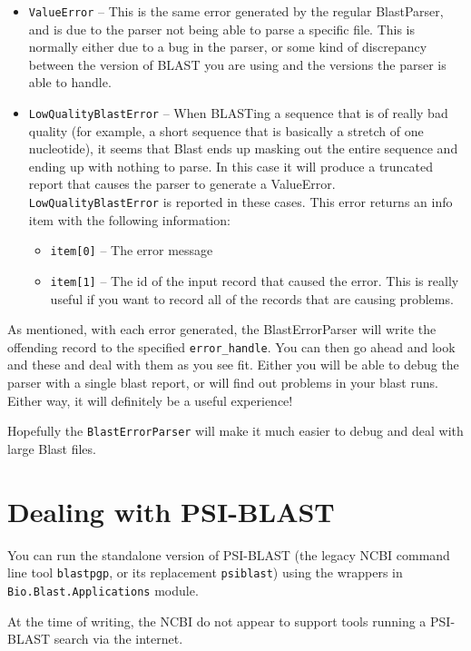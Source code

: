 \documentclass{report}
\begin{document}
\begin{itemize}
  \item \verb|ValueError| -- This is the same error generated by the regular BlastParser, and is due to the parser not being able to parse a specific file. This is normally either due to a bug in the parser, or some kind of discrepancy between the version of BLAST you are using and the versions the parser is able to handle.

  \item \verb|LowQualityBlastError| -- When BLASTing a sequence that is of really bad quality (for example, a short sequence that is basically a stretch of one nucleotide), it seems that Blast ends up masking out the entire sequence and ending up with nothing to parse. In this case it will produce a truncated report that causes the parser to generate a ValueError. \verb|LowQualityBlastError| is reported in these cases. This error returns an info item with the following information:
  \begin{itemize}
    \item \verb|item[0]| -- The error message
    \item \verb|item[1]| -- The id of the input record that caused the error. This is really useful if you want to record all of the records that are causing problems.
  \end{itemize}
\end{itemize}

As mentioned, with each error generated, the BlastErrorParser will write the offending record to the specified \verb|error_handle|. You can then go ahead and look and these and deal with them as you see fit. Either you will be able to debug the parser with a single blast report, or will find out problems in your blast runs. Either way, it will definitely be a useful experience!

Hopefully the \verb|BlastErrorParser| will make it much easier to debug and deal with large Blast files.

\section{Dealing with PSI-BLAST}

You can run the standalone version of PSI-BLAST (the legacy NCBI command line
tool \verb|blastpgp|, or its replacement \verb|psiblast|) using the wrappers
in \verb|Bio.Blast.Applications| module.

At the time of writing, the NCBI do not appear to support tools running a
PSI-BLAST search via the internet.
\end{document}
